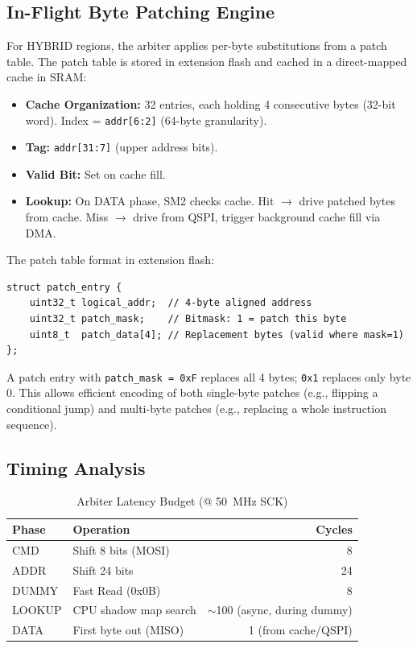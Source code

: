 \subsection{In-Flight Byte Patching Engine}
For HYBRID regions, the arbiter applies per-byte substitutions from a patch table. The patch table is stored in extension flash and cached in a direct-mapped cache in \rp \ac{SRAM}:

\begin{itemize}
    \item \textbf{Cache Organization:} 32 entries, each holding 4 consecutive bytes (32-bit word). Index = \texttt{addr[6:2]} (64-byte granularity).
    \item \textbf{Tag:} \texttt{addr[31:7]} (upper address bits).
    \item \textbf{Valid Bit:} Set on cache fill.
    \item \textbf{Lookup:} On DATA phase, SM2 checks cache. Hit $\to$ drive patched bytes from cache. Miss $\to$ drive from QSPI, trigger background cache fill via DMA.
\end{itemize}

The patch table format in extension flash:
\begin{lstlisting}[style=vbfcStyle, caption={Patch Table Entry (8 bytes)}, label={lst:patch_entry}]
struct patch_entry {
    uint32_t logical_addr;  // 4-byte aligned address
    uint32_t patch_mask;    // Bitmask: 1 = patch this byte
    uint8_t  patch_data[4]; // Replacement bytes (valid where mask=1)
};
\end{lstlisting}

A patch entry with \texttt{patch\_mask = 0xF} replaces all 4 bytes; \texttt{0x1} replaces only byte 0. This allows efficient encoding of both single-byte patches (e.g., flipping a conditional jump) and multi-byte patches (e.g., replacing a whole instruction sequence).

\subsection{Timing Analysis}
\begin{table}[h]
\centering
\caption{Arbiter Latency Budget (@ \SI{50}{MHz} SCK)}
\label{tab:timing_budget}
\begin{tabular}{@{}llr@{}}
\toprule
\textbf{Phase} & \textbf{Operation} & \textbf{Cycles} \\
\midrule
CMD      & Shift 8 bits (MOSI) & 8 \\
ADDR     & Shift 24 bits       & 24 \\
DUMMY    & Fast Read (0x0B)    & 8 \\
LOOKUP   & CPU shadow map search & $\sim$100 (async, during dummy) \\
DATA     & First byte out (MISO) & 1 (from cache/QSPI) \\
\bottomrule
\end{tabular}
\end{table}

